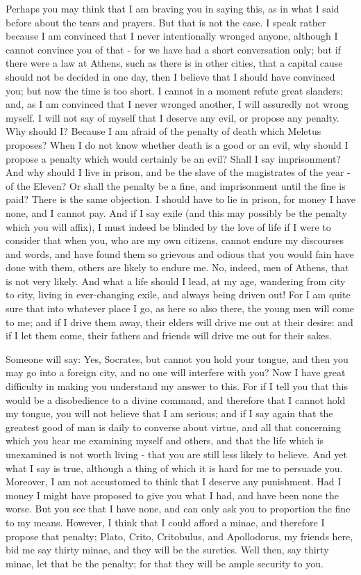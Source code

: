 \documentclass[11pt]{article}
\begin{document}
Perhaps you may think that I am braving you in saying this, as in what I said before about the tears and prayers. But that is not the case. I speak rather because I am convinced that I never intentionally wronged anyone, although I cannot convince you of that - for we have had a short conversation only; but if there were a law at Athens, such as there is in other cities, that a capital cause should not be decided in one day, then I believe that I should have convinced you; but now the time is too short. I cannot in a moment refute great slanders; and, as I am convinced that I never wronged another, I will assuredly not wrong myself. I will not say of myself that I deserve any evil, or propose any penalty. Why should I? Because I am afraid of the penalty of death which Meletus proposes? When I do not know whether death is a good or an evil, why should I propose a penalty which would certainly be an evil? Shall I say imprisonment? And why should I live in prison, and be the slave of the magistrates of the year - of the Eleven? Or shall the penalty be a fine, and imprisonment until the fine is paid? There is the same objection. I should have to lie in prison, for money I have none, and I cannot pay. And if I say exile (and this may possibly be the penalty which you will affix), I must indeed be blinded by the love of life if I were to consider that when you, who are my own citizens, cannot endure my discourses and words, and have found them so grievous and odious that you would fain have done with them, others are likely to endure me. No, indeed, men of Athens, that is not very likely. And what a life should I lead, at my age, wandering from city to city, living in ever-changing exile, and always being driven out! For I am quite sure that into whatever place I go, as here so also there, the young men will come to me; and if I drive them away, their elders will drive me out at their desire: and if I let them come, their fathers and friends will drive me out for their sakes.

Someone will say: Yes, Socrates, but cannot you hold your tongue, and then you may go into a foreign city, and no one will interfere with you? Now I have great difficulty in making you understand my answer to this. For if I tell you that this would be a disobedience to a divine command, and therefore that I cannot hold my tongue, you will not believe that I am serious; and if I say again that the greatest good of man is daily to converse about virtue, and all that concerning which you hear me examining myself and others, and that the life which is unexamined is not worth living - that you are still less likely to believe. And yet what I say is true, although a thing of which it is hard for me to persuade you. Moreover, I am not accustomed to think that I deserve any punishment. Had I money I might have proposed to give you what I had, and have been none the worse. But you see that I have none, and can only ask you to proportion the fine to my means. However, I think that I could afford a minae, and therefore I propose that penalty; Plato, Crito, Critobulus, and Apollodorus, my friends here, bid me say thirty minae, and they will be the sureties. Well then, say thirty minae, let that be the penalty; for that they will be ample security to you.
\end{document}
